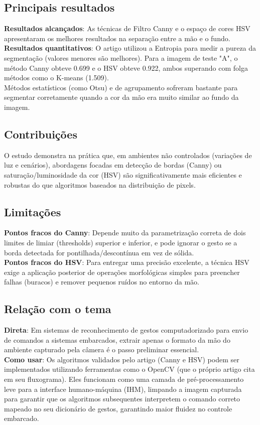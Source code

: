 \documentclass[12pt, a4paper]{article}
\begin{document}
\subsection{Principais resultados}
\textbf{Resultados alcançados}: As técnicas de Filtro Canny e o espaço de cores HSV apresentaram os melhores resultados na separação entre a mão e o fundo.\\
\textbf{Resultados quantitativos}: O artigo utilizou a Entropia para medir a pureza da segmentação (valores menores são melhores). Para a imagem de teste "A", o método Canny obteve 0.699 e o HSV obteve 0.922, ambos superando com folga métodos como o K-means (1.509).\\
Métodos estatísticos (como Otsu) e de agrupamento sofreram bastante para segmentar corretamente quando a cor da mão era muito similar ao fundo da imagem.\\
\subsection{Contribuições}
O estudo demonstra na prática que, em ambientes não controlados (variações de luz e cenários), abordagens focadas em detecção de bordas (Canny) ou saturação/luminosidade da cor (HSV) são significativamente mais eficientes e robustas do que algoritmos baseados na distribuição de pixels.\\
\subsection{Limitações}
\textbf{Pontos fracos do Canny}: Depende muito da parametrização correta de dois limites de limiar (thresholds) superior e inferior, e pode ignorar o gesto se a borda detectada for pontilhada/descontínua em vez de sólida.\\
\textbf{Pontos fracos do HSV}: Para entregar uma precisão excelente, a técnica HSV exige a aplicação posterior de operações morfológicas simples para preencher falhas (buracos) e remover pequenos ruídos no entorno da mão.\\
\subsection{Relação com o tema}
\textbf{Direta}: Em sistemas de reconhecimento de gestos computadorizado para envio de comandos a sistemas embarcados, extrair apenas o formato da mão do ambiente capturado pela câmera é o passo preliminar essencial.\\
\textbf{Como usar}: Os algoritmos validados pelo artigo (Canny e HSV) podem ser implementados utilizando ferramentas como o OpenCV (que o próprio artigo cita em seu fluxograma). Eles funcionam como uma camada de pré-processamento leve para a interface humano-máquina (IHM), limpando a imagem capturada para garantir que os algoritmos subsequentes interpretem o comando correto mapeado no seu dicionário de gestos, garantindo maior fluidez no controle embarcado.\\
\end{document}

